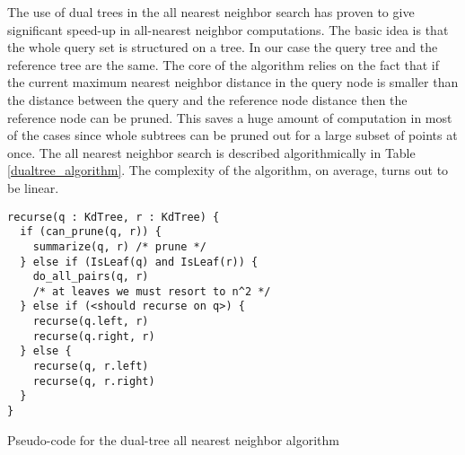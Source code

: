 \documentclass[12pt,letterpaper,doublespaced,ETD,dvips,proposal]{gtthesis}
\begin{document}
\begin{Body}
The use of dual trees in the all nearest neighbor search has proven
to give significant speed-up in all-nearest neighbor computations.
The basic idea is that the whole query set is structured on a tree.
In our case the query tree and the reference tree are the same. The
core of the algorithm relies on the fact that if the current maximum
nearest neighbor distance in the query node is smaller than the
distance between the query and the reference node distance then the
reference node can be pruned. This saves a huge amount of
computation in most of the cases since whole  subtrees can be pruned
out for a large subset of points at once. The all nearest neighbor
search is described algorithmically in Table
\ref{dualtree_algorithm}. The complexity of the algorithm, on
average, turns out to be linear.

\begin{table}
\begin{verbatim}
recurse(q : KdTree, r : KdTree) {
  if (can_prune(q, r)) {
    summarize(q, r) /* prune */
  } else if (IsLeaf(q) and IsLeaf(r)) {
    do_all_pairs(q, r)
    /* at leaves we must resort to n^2 */
  } else if (<should recurse on q>) {
    recurse(q.left, r)
    recurse(q.right, r)
  } else {
    recurse(q, r.left)
    recurse(q, r.right)
  }
}
\end{verbatim}
\caption{Pseudo-code for the dual-tree all nearest neighbor
algorithm} \label{dualtree_algorithm}
\end{table}








\end{Body}
\end{document}

